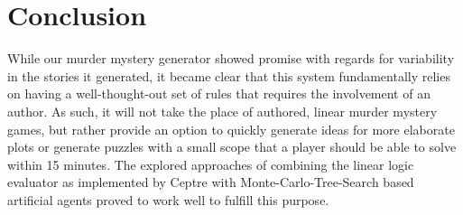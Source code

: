 \section{Conclusion} \label{conclusion}

While our murder mystery generator showed promise with regards for variability in the stories it generated, it became clear that this system fundamentally relies on having a well-thought-out set of rules that requires the involvement of an author.
As such, it will not take the place of authored, linear murder mystery games, but rather provide an option to quickly generate ideas for more elaborate plots or generate puzzles with a small scope that a player should be able to solve within 15 minutes.
The explored approaches of combining the linear logic evaluator as implemented by Ceptre with Monte-Carlo-Tree-Search based artificial agents proved to work well to fulfill this purpose.
